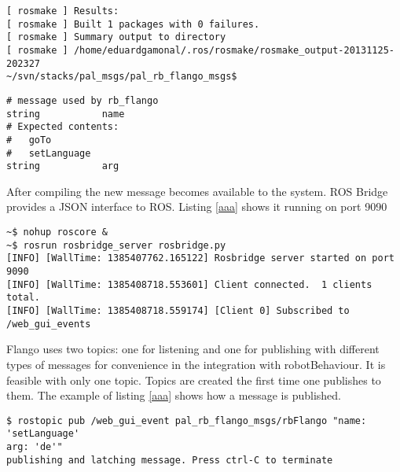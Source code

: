 \begin{lstlisting}[caption=Flango files layout, label=impl-ros-create-message]
[ rosmake ] Results:                                                                                                                                                                                                
[ rosmake ] Built 1 packages with 0 failures.                                                                                                                                                                       
[ rosmake ] Summary output to directory                                                                                                                                                                             
[ rosmake ] /home/eduardgamonal/.ros/rosmake/rosmake_output-20131125-202327                                                                                                                                         
~/svn/stacks/pal_msgs/pal_rb_flango_msgs$ 
\end{lstlisting}

\begin{lstlisting}[caption=Message type from robotBehaviour to Flango CM (rbFlango.msg), label=impl-flango-ros-message]
# message used by rb_flango
string           name
# Expected contents:
#   goTo
#   setLanguage
string           arg

\end{lstlisting}

After compiling the new message becomes available to the system.
ROS Bridge provides a \ac{JSON} interface to \ac{ROS}. Listing \ref{aaa} shows it running on port 9090

\begin{lstlisting}[caption=ROS Bridge running, label=impl-flango-ros-rosbridge]
~$ nohup roscore &
~$ rosrun rosbridge_server rosbridge.py 
[INFO] [WallTime: 1385407762.165122] Rosbridge server started on port 9090
[INFO] [WallTime: 1385408718.553601] Client connected.  1 clients total.
[INFO] [WallTime: 1385408718.559174] [Client 0] Subscribed to /web_gui_events

\end{lstlisting}

Flango \cm uses two topics: one for listening and one for publishing with different types of messages for convenience in the integration with robotBehaviour.
It is feasible with only one topic.
Topics are created the first time one publishes to them.
The example of listing \ref{aaa} shows how a message is published.
\begin{lstlisting}[caption=Publishing to a topic, label=impl-flango-ros-topic-pub]
$ rostopic pub /web_gui_event pal_rb_flango_msgs/rbFlango "name: 'setLanguage'
arg: 'de'" 
publishing and latching message. Press ctrl-C to terminate
\end{lstlisting}

